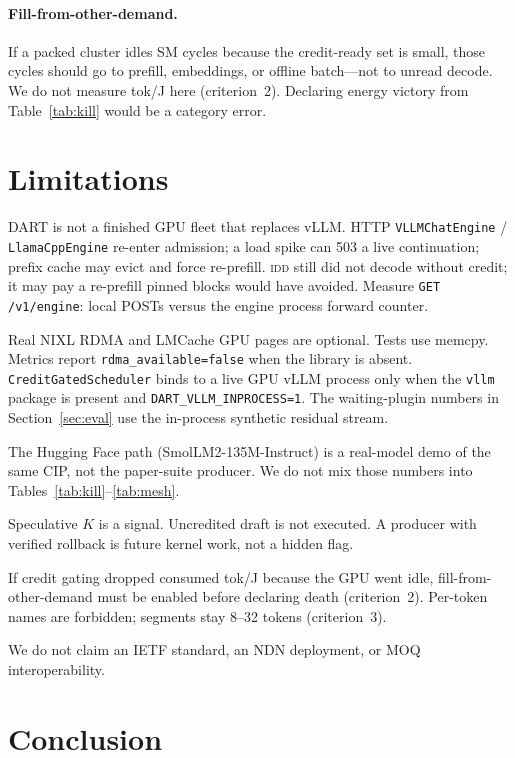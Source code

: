 \documentclass{article}
\theoremstyle{definition}
\newcommand{\idd}{\textsc{idd}}
\begin{document}
\paragraph{Fill-from-other-demand.}
If a packed cluster idles SM cycles because the credit-ready set is small, those cycles should go to prefill, embeddings, or offline batch---not to unread decode.
We do not measure tok/J here (criterion~2).
Declaring energy victory from Table~\ref{tab:kill} would be a category error.

\section{Limitations}
\label{sec:limits}

DART is not a finished GPU fleet that replaces vLLM.
HTTP \texttt{VLLMChatEngine} / \texttt{LlamaCppEngine} re-enter admission; a load spike can 503 a live continuation; prefix cache may evict and force re-prefill.
\idd{} still did not decode without credit; it may pay a re-prefill pinned blocks would have avoided.
Measure \texttt{GET /v1/engine}: local POSTs versus the engine process forward counter.

Real NIXL RDMA and LMCache GPU pages are optional.
Tests use memcpy.
Metrics report \texttt{rdma\_available=false} when the library is absent.
\texttt{CreditGatedScheduler} binds to a live GPU vLLM process only when the \texttt{vllm} package is present and \texttt{DART\_VLLM\_INPROCESS=1}.
The waiting-plugin numbers in Section~\ref{sec:eval} use the in-process synthetic residual stream.

The Hugging Face path (SmolLM2-135M-Instruct) is a real-model demo of the same CIP, not the paper-suite producer.
We do not mix those numbers into Tables~\ref{tab:kill}--\ref{tab:mesh}.

Speculative $K$ is a signal.
Uncredited draft is not executed.
A producer with verified rollback is future kernel work, not a hidden flag.

If credit gating dropped consumed tok/J because the GPU went idle, fill-from-other-demand must be enabled before declaring death (criterion~2).
Per-token names are forbidden; segments stay 8--32 tokens (criterion~3).

We do not claim an IETF standard, an NDN deployment, or MOQ interoperability.

\section{Conclusion}
\label{sec:conc}
\end{document}
